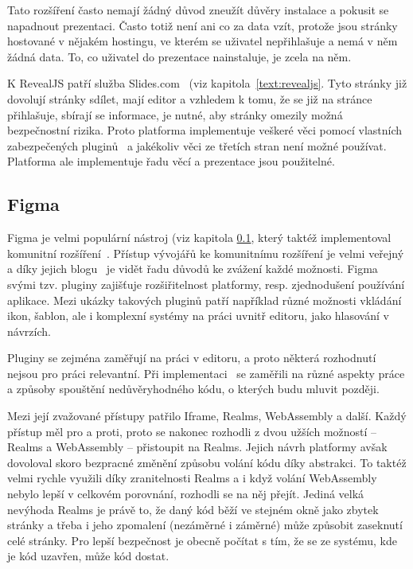 Tato rozšíření často nemají žádný důvod zneužít důvěry instalace a pokusit se napadnout prezentaci.
Často totiž není ani co za data vzít, protože jsou stránky hostované v nějakém hostingu, ve kterém se uživatel nepřihlašuje a nemá v něm žádná data.
To, co uživatel do prezentace nainstaluje, je zcela na něm.

K RevealJS patří služba Slides.com~\cite{slidescom} (viz kapitola~\ref{text:revealjs}.
Tyto stránky již dovolují stránky sdílet, mají editor a vzhledem k tomu, že se již na stránce přihlašuje, sbírají se informace, je nutné, aby stránky omezily možná bezpečnostní rizika.
Proto platforma implementuje veškeré věci pomocí vlastních zabezpečených pluginů~\cite{slidescom} a jakékoliv věci ze třetích stran není možné používat.
Platforma ale implementuje řadu věcí a prezentace jsou použitelné.

\subsection{Figma}\label{text:figma}

Figma je velmi populární nástroj (viz kapitola \ref{text:figma}, který taktéž implementoval komunitní rozšíření~\cite{figma_website}.
Přístup vývojářů ke komunitnímu rozšíření je velmi veřejný a díky jejich blogu~\cite{figma_plugins_blog} je vidět řadu důvodů ke zvážení každé možnosti.
Figma svými tzv. pluginy zajišťuje rozšiřitelnost platformy, resp. zjednodušení používání aplikace.
Mezi ukázky takových pluginů patří například různé možnosti vkládání ikon, šablon, ale i komplexní systémy na práci uvnitř editoru, jako hlasování v návrzích.

Pluginy se zejména zaměřují na práci v editoru, a proto některá rozhodnutí nejsou pro práci relevantní.
Při implementaci~\cite{figma_plugins_blog} se zaměřili na různé aspekty práce a způsoby spouštění nedůvěryhodného kódu, o kterých budu mluvit později.

Mezi její zvažované přístupy patřilo Iframe, Realms, WebAssembly a další.
Každý přístup měl pro a proti, proto se nakonec rozhodli z dvou užších možností -- Realms a WebAssembly -- přistoupit na Realms.
Jejich návrh platformy avšak dovoloval skoro bezpracné změnění způsobu volání kódu díky abstrakci.
To taktéž velmi rychle využili díky zranitelnosti Realms a i když volání WebAssembly nebylo lepší v celkovém porovnání, rozhodli se na něj přejít.
Jediná velká nevýhoda Realms je právě to, že daný kód běží ve stejném okně jako zbytek stránky a třeba i jeho zpomalení (nezáměrné i záměrné) může způsobit zaseknutí celé stránky.
Pro lepší bezpečnost je obecně počítat s tím, že se ze systému, kde je kód uzavřen, může kód dostat.

